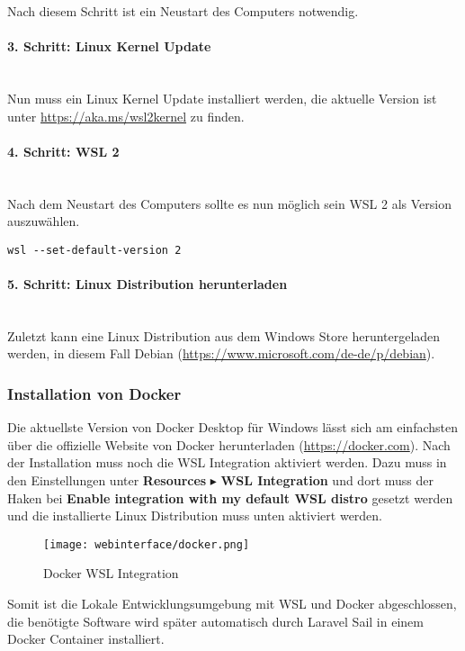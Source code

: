 Nach diesem Schritt ist ein Neustart des Computers notwendig.

\paragraph{3. Schritt: Linux Kernel Update}\mbox{}\\
Nun muss ein Linux Kernel Update installiert werden, die aktuelle Version ist
unter \url{https://aka.ms/wsl2kernel} zu finden.

\paragraph{4. Schritt: WSL 2}\mbox{}\\
Nach dem Neustart des Computers sollte es nun möglich sein WSL 2 als Version
auszuwählen.
\begin{lstlisting}[caption={WSL 2 auswählen}, captionpos=b]
  wsl --set-default-version 2
\end{lstlisting}

\paragraph{5. Schritt: Linux Distribution herunterladen}\mbox{}\\
Zuletzt kann eine Linux Distribution aus dem Windows Store heruntergeladen
werden, in diesem Fall Debian (\url{https://www.microsoft.com/de-de/p/debian}).

\subsubsection{Installation von Docker}
Die aktuellste Version von Docker Desktop für Windows lässt sich am einfachsten
über die offizielle Website von Docker herunterladen (\url{https://docker.com}).
Nach der Installation muss noch die WSL Integration aktiviert werden. Dazu muss
in den Einstellungen unter \textbf{Resources} $\blacktriangleright$ \textbf{WSL Integration} und
dort muss der Haken bei \textbf{Enable integration with my default WSL distro} gesetzt
werden und die installierte Linux Distribution muss unten aktiviert werden.

\begin{figure}[H]
  \centering
  \texttt{[image: webinterface/docker.png]}
  \caption{Docker WSL Integration}
\end{figure}

Somit ist die Lokale Entwicklungsumgebung mit WSL und Docker abgeschlossen, die
benötigte Software wird später automatisch durch Laravel Sail in einem Docker
Container installiert.

